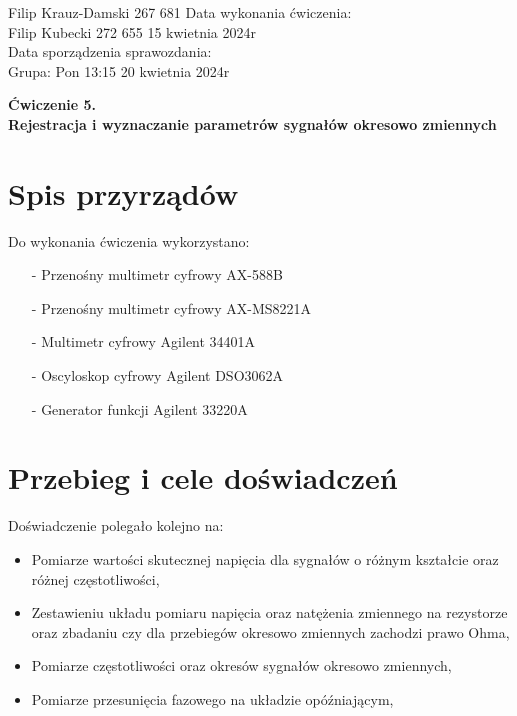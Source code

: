 \documentclass[11pt]{article}
\begin{document}
    \begin{flushleft}
        Filip Krauz-Damski 267 681 \hfill Data wykonania ćwiczenia:\\
        Filip Kubecki 272 655 \hfill 15 kwietnia 2024r\\
        \hfill Data sporządzenia sprawozdania:\\
        Grupa: Pon 13:15 \hfill 20 kwietnia 2024r\\
    \end{flushleft}
    \begin{center}
        \Large\textbf{Ćwiczenie 5.}\\
        \textbf{Rejestracja i wyznaczanie parametrów
        sygnałów okresowo zmiennych}
    \end{center}
    \vspace{1cm}

    \section{Spis przyrządów}
    \par{
        Do wykonania ćwiczenia wykorzystano:
        \begin{itemize}
            \setlength\itemsep{0em}
            \item[-] Przenośny multimetr cyfrowy AX-588B
            \item[-] Przenośny multimetr cyfrowy AX-MS8221A
            \item[-] Multimetr cyfrowy Agilent 34401A
            \item[-] Oscyloskop cyfrowy Agilent DSO3062A
            \item[-] Generator funkcji Agilent 33220A
        \end{itemize}
    }
    \section{Przebieg i cele doświadczeń}
    Doświadczenie polegało kolejno na:
    \begin{itemize}
        \setlength\itemsep{0em}
        \item Pomiarze wartości skutecznej napięcia dla sygnałów o różnym kształcie oraz różnej częstotliwości,
        \item Zestawieniu układu pomiaru napięcia oraz natężenia zmiennego na rezystorze oraz zbadaniu czy dla przebiegów okresowo zmiennych zachodzi prawo Ohma,
        \item Pomiarze częstotliwości oraz okresów sygnałów okresowo zmiennych,
        \item Pomiarze przesunięcia fazowego na układzie opóźniającym,
    \end{itemize}
    \newpage
\end{document}
